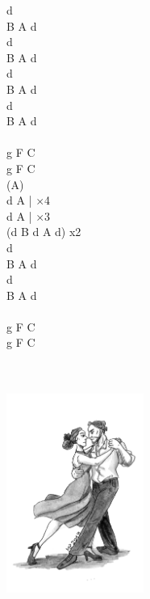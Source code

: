 \documentclass[a5paper, 10pt]{book}
\begin{document}
\begin{minipage}[t]{0.2\textwidth}
  d\\
  B A d\\
  d\\
  B A d\\
  d\\
  B A d\\
  d\\
  B A d\\
  \\
g F C\\
g F C\\
(A)\\
 d A | $\times$4\\
 d A | $\times$3\\
 (d B d A d) x2\\

 d\\
B A d\\
d\\
B A d\\
\\
g F C\\
g F C\\
\end{minipage}
~\\
~\\
\includegraphics[height=6.5cm, center]{takie_tango.png}\\

\newpage
\end{document}
